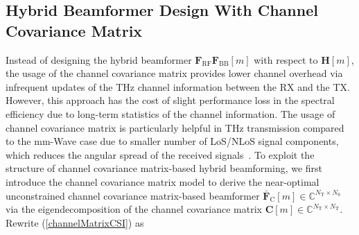 \documentclass[journal,10pt]{IEEEtran}
\begin{document}
	\subsection{Hybrid Beamformer Design With Channel Covariance Matrix}
	\label{sec:HBdesignCCM}
	Instead of designing the hybrid beamformer $\mathbf{F}_\mathrm{RF}\mathbf{F}_\mathrm{BB}[m]$ with respect to $\mathbf{H}[m]$, the usage of the channel covariance matrix provides lower channel overhead via infrequent updates of the THz channel information between the RX and the TX. However, this approach has the cost of slight performance loss in the spectral efficiency due to long-term statistics of the channel information. The usage of channel covariance matrix is particularly helpful in THz transmission compared to the mm-Wave case due to smaller number of LoS/NLoS signal components, which reduces the angular spread of the received signals~\cite{ummimoTareqOverview}.  To exploit the structure of channel covariance matrix-based hybrid beamforming, we first introduce the channel covariance matrix model to derive the near-optimal unconstrained channel covariance matrix-based beamformer $\bar{\mathbf{F}}_\mathrm{C}[m]\in \mathbb{C}^{N_\mathrm{T}\times N_\mathrm{S}}$ via the eigendecomposition of the channel covariance matrix $\mathbf{C}[m]\in \mathbb{C}^{N_\mathrm{T}\times N_\mathrm{T}}$. Rewrite (\ref{channelMatrixCSI}) as
\end{document}
